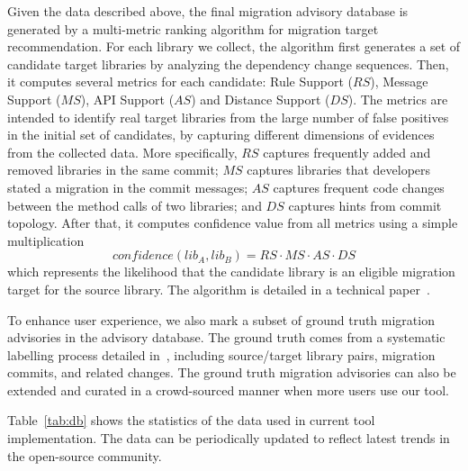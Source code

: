 \documentclass[conference,10pt]{IEEEtran}
\begin{document}
Given the data described above, the final migration advisory database is generated by a multi-metric ranking algorithm for migration target recommendation.
For each library we collect, the algorithm first generates a set of candidate target libraries by analyzing the dependency change sequences.
Then, it computes several metrics for each candidate: Rule Support ($RS$), Message Support ($MS$), API Support ($AS$) and Distance Support ($DS$). The metrics are intended to identify real target libraries from the large number of false positives in the initial set of candidates, by capturing different dimensions of evidences from the collected data.
More specifically, $RS$ captures frequently added and removed libraries in the same commit; $MS$ captures libraries that developers stated a migration in the commit messages; $AS$ captures frequent code changes between the method calls of two libraries; and $DS$ captures hints from commit topology. 
After that, it computes confidence value from all metrics using a simple multiplication
\begin{equation}
    confidence(lib_A, lib_B) = RS \cdot MS \cdot AS \cdot DS
\end{equation}
which represents the likelihood that the candidate library is an eligible migration target for the source library. 
The algorithm is detailed in a technical paper~\cite{our-paper}.

To enhance user experience, we also mark a subset of ground truth migration advisories in the advisory database. 
The ground truth comes from a systematic labelling process detailed in~\cite{our-paper}, including source/target library pairs, migration commits, and related  changes. 
The ground truth migration advisories can also be extended and curated in a crowd-sourced manner when more users use our tool.

Table~\ref{tab:db} shows the statistics of the data used in current tool implementation. The data can be periodically updated to reflect latest trends in the open-source community.
\end{document}
